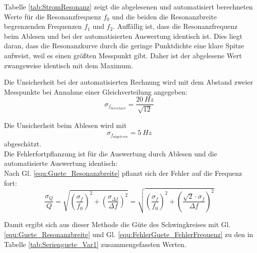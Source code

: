 \documentclass[12pt,a4paper]{article}
\begin{document}
Tabelle \ref{tab:StromResonanz} zeigt die abgelesenen und automatisiert berechneten Werte für die Resonanzfrequenz $f_0$ und die beiden die Resonanzbreite begrenzenden Frequenzen $f_1$ und $f_2$. Auffällig ist, dass die Resonanzfrequenz beim Ablesen und bei der automatisierten Auswertung identisch ist. Dies liegt daran, dass die Resonanzkurve durch die geringe Punktdichte eine klare Spitze aufweist, weil es einen größten Messpunkt gibt. Daher ist der abgelesene Wert zwangsweise identisch mit dem Maximum.



Die Unsicherheit bei der automatisierten Rechnung wird mit dem Abstand zweier Messpunkte bei Annahme einer Gleichverteilung angegeben:
\begin{equation*}
\sigma_{f_{berechnet}} = \dfrac{\SI{20}{Hz}}{\sqrt{12}}
\end{equation*}

Die Unsicherheit beim Ablesen wird mit 
\begin{equation*}
\sigma_{f_{abgelesen}} = \SI{5}{Hz}
\end{equation*}
abgeschätzt.\\

Die Fehlerfortpflanzung ist für die Auswertung durch Ablesen und die automatisierte Auswertung identisch:\\
Nach Gl. \ref{equ:Guete_Resonanzbreite} pflanzt sich der Fehler auf die Frequenz fort:
\begin{equation}
\dfrac{\sigma_Q}{Q} = \sqrt{\left( \dfrac{\sigma_f}{f_0} \right)^2 + \left( \dfrac{\sigma_{\Delta f}}{\Delta f} \right)^2} = \sqrt{\left( \dfrac{\sigma_f}{f_0} \right)^2 + \left( \dfrac{\sqrt{2} \cdot \sigma _f}{\Delta f} \right)^2}
\label{equ:FehlerGuete_FehlerFrequenz}
\end{equation}

Damit ergibt sich aus dieser Methode die Güte des Schwingkreises mit Gl. \ref{equ:Guete_Resonanzbreite} und Gl. \ref{equ:FehlerGuete_FehlerFrequenz} zu den in Tabelle \ref{tab:Serienguete_Var1} zusammengefassten Werten.
\end{document}
